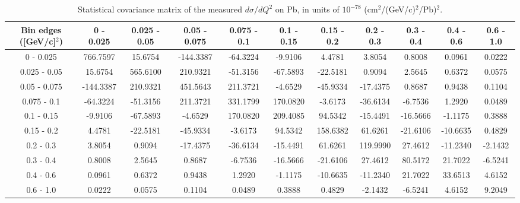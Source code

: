 \documentclass[aps,prl,twocolumn,superscriptaddress,nofootinbib]{revtex4-1}
\begin{document}
\begin{turnpage}
 \begin{table}[h!]
  \centering
  \caption{Statistical covariance matrix of the measured $d\sigma/dQ^{2}$ on Pb, in units of $10^{-78}$ (cm$^{2}$/(GeV/c)$^{2}$/Pb)$^{2}$.}
    \begin{tabular}{c||cccccccccc}
      Bin edges ([GeV/c]$^{2}$) & 0 - 0.025 & 0.025 - 0.05 & 0.05 - 0.075 & 0.075 - 0.1 & 0.1 - 0.15 & 0.15 - 0.2 & 0.2 - 0.3 & 0.3 - 0.4 & 0.4 - 0.6 & 0.6 - 1.0 \\
\hline \hline
         0 - 0.025 & 766.7597 & 15.6754 & -144.3387 & -64.3224 & -9.9106 &  4.4781 &  3.8054 &  0.8008 &  0.0961 &  0.0222 \\
      0.025 - 0.05 & 15.6754 & 565.6100 & 210.9321 & -51.3156 & -67.5893 & -22.5181 &  0.9094 &  2.5645 &  0.6372 &  0.0575 \\
      0.05 - 0.075 & -144.3387 & 210.9321 & 451.5643 & 211.3721 & -4.6529 & -45.9334 & -17.4375 &  0.8687 &  0.9438 &  0.1104 \\
       0.075 - 0.1 & -64.3224 & -51.3156 & 211.3721 & 331.1799 & 170.0820 & -3.6173 & -36.6134 & -6.7536 &  1.2920 &  0.0489 \\
        0.1 - 0.15 & -9.9106 & -67.5893 & -4.6529 & 170.0820 & 209.4085 & 94.5342 & -15.4491 & -16.5666 & -1.1175 &  0.3888 \\
        0.15 - 0.2 &  4.4781 & -22.5181 & -45.9334 & -3.6173 & 94.5342 & 158.6382 & 61.6261 & -21.6106 & -10.6635 &  0.4829 \\
         0.2 - 0.3 &  3.8054 &  0.9094 & -17.4375 & -36.6134 & -15.4491 & 61.6261 & 119.9990 & 27.4612 & -11.2340 & -2.1432 \\
         0.3 - 0.4 &  0.8008 &  2.5645 &  0.8687 & -6.7536 & -16.5666 & -21.6106 & 27.4612 & 80.5172 & 21.7022 & -6.5241 \\
         0.4 - 0.6 &  0.0961 &  0.6372 &  0.9438 &  1.2920 & -1.1175 & -10.6635 & -11.2340 & 21.7022 & 33.6513 &  4.6152 \\
         0.6 - 1.0 &  0.0222 &  0.0575 &  0.1104 &  0.0489 &  0.3888 &  0.4829 & -2.1432 & -6.5241 &  4.6152 &  9.2049 \\
    \end{tabular}
  \label{tablecov:Pb_Statistical_Q2}
 \end{table}
\end{turnpage}
\end{document}
